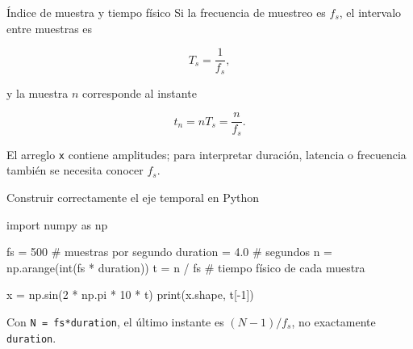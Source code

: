 \documentclass[
  ignorenonframetext,
  aspectratio=169,
  spanish,
  professionalfonts]{beamer}
\newenvironment{Shaded}{\begin{snugshade}}{\end{snugshade}}
\newcommand{\BuiltInTok}[1]{\textcolor[rgb]{0.00,0.23,0.31}{#1}}
\newcommand{\CommentTok}[1]{\textcolor[rgb]{0.37,0.37,0.37}{#1}}
\newcommand{\DecValTok}[1]{\textcolor[rgb]{0.68,0.00,0.00}{#1}}
\newcommand{\FloatTok}[1]{\textcolor[rgb]{0.68,0.00,0.00}{#1}}
\newcommand{\ImportTok}[1]{\textcolor[rgb]{0.00,0.46,0.62}{#1}}
\newcommand{\NormalTok}[1]{\textcolor[rgb]{0.00,0.23,0.31}{#1}}
\newcommand{\OperatorTok}[1]{\textcolor[rgb]{0.37,0.37,0.37}{#1}}
\begin{document}
\begin{frame}[fragile]{Índice de muestra y tiempo físico}
\protect{}\label{uxedndice-de-muestra-y-tiempo-fuxedsico}
Si la frecuencia de muestreo es \(f_s\), el intervalo entre muestras es

\[
T_s=\frac{1}{f_s},
\]

y la muestra \(n\) corresponde al instante

\[
t_n=nT_s=\frac{n}{f_s}.
\]

\begin{tcolorbox}[enhanced jigsaw, arc=.35mm, bottomrule=.15mm, bottomtitle=1mm, breakable, colback=white, colbacktitle=quarto-callout-important-color!10!white, colframe=quarto-callout-important-color-frame, coltitle=black, left=2mm, leftrule=.75mm, opacityback=0, opacitybacktitle=0.6, rightrule=.15mm, title={Consecuencia}, titlerule=0mm, toprule=.15mm, toptitle=1mm]

El arreglo \texttt{x} contiene amplitudes; para interpretar duración,
latencia o frecuencia también se necesita conocer \(f_s\).

\end{tcolorbox}
\end{frame}

\begin{frame}[fragile]{Construir correctamente el eje temporal en
Python}
\protect{}\label{construir-correctamente-el-eje-temporal-en-python}
\begin{Shaded}
\begin{Highlighting}[]
\ImportTok{import}\NormalTok{ numpy }\ImportTok{as}\NormalTok{ np}

\NormalTok{fs }\OperatorTok{=} \DecValTok{500}                 \CommentTok{\# muestras por segundo}
\NormalTok{duration }\OperatorTok{=} \FloatTok{4.0}           \CommentTok{\# segundos}
\NormalTok{n }\OperatorTok{=}\NormalTok{ np.arange(}\BuiltInTok{int}\NormalTok{(fs }\OperatorTok{*}\NormalTok{ duration))}
\NormalTok{t }\OperatorTok{=}\NormalTok{ n }\OperatorTok{/}\NormalTok{ fs               }\CommentTok{\# tiempo físico de cada muestra}

\NormalTok{x }\OperatorTok{=}\NormalTok{ np.sin(}\DecValTok{2} \OperatorTok{*}\NormalTok{ np.pi }\OperatorTok{*} \DecValTok{10} \OperatorTok{*}\NormalTok{ t)}
\BuiltInTok{print}\NormalTok{(x.shape, t[}\OperatorTok{{-}}\DecValTok{1}\NormalTok{])}
\end{Highlighting}
\end{Shaded}

\begin{tcolorbox}[enhanced jigsaw, arc=.35mm, bottomrule=.15mm, bottomtitle=1mm, breakable, colback=white, colbacktitle=quarto-callout-warning-color!10!white, colframe=quarto-callout-warning-color-frame, coltitle=black, left=2mm, leftrule=.75mm, opacityback=0, opacitybacktitle=0.6, rightrule=.15mm, title={Detalle importante}, titlerule=0mm, toprule=.15mm, toptitle=1mm]

Con \texttt{N\ =\ fs*duration}, el último instante es \((N-1)/f_s\), no
exactamente \texttt{duration}.

\end{tcolorbox}
\end{frame}
\end{document}
